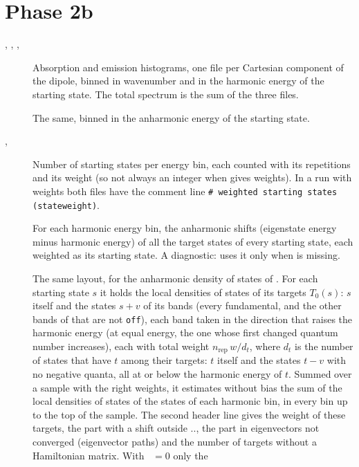 \section{Phase 2b}\label{sec:out-2b}
\begin{description}
\item[, , , ]
  Absorption and emission histograms, one file per Cartesian component of
  the dipole, binned in wavenumber and in the harmonic energy of the
  starting state. The total spectrum is the sum of the three files.
\item[] The same, binned in the anharmonic energy of the
  starting state.
\item[, ] Number of starting
  states per energy bin, each counted with its repetitions and its weight
  (so not always an integer when  gives weights). In a
  run with weights both files have the comment line
  \texttt{\# weighted starting states (stateweight)}.
\item[] For each harmonic energy bin, the anharmonic
  shifts (eigenstate energy minus harmonic energy) of all the target states
  of every starting state, each weighted as its starting state. A
  diagnostic:  uses it only when 
  is missing.
\item[] The same layout, for the anharmonic density of
  states of . For each starting state $s$ it
  holds the local densities of states of its targets $T_0(s)$: $s$ itself
  and the states $s + v$ of its bands (every fundamental, and the other
  bands of  that are not \texttt{off}), each band taken
  in the direction that raises the harmonic energy (at equal energy, the
  one whose first changed quantum number increases), each with total weight
  $n_\mathrm{rep}\,w/d_t$, where $d_t$ is the number of states that have
  $t$ among their targets: $t$ itself and the states $t - v$ with no
  negative quanta, all at or below the harmonic energy of $t$. Summed over
  a sample with the right weights, it estimates without bias the sum of
  the local densities of states of the states of each harmonic bin, in
  every bin up to the top of the sample. The
  second header line gives the weight of these targets, the part with a
  shift outside .., the part in
  eigenvectors not converged (eigenvector paths) and the number of targets
  without a Hamiltonian matrix. With ~$=0$ only the

\end{description}
